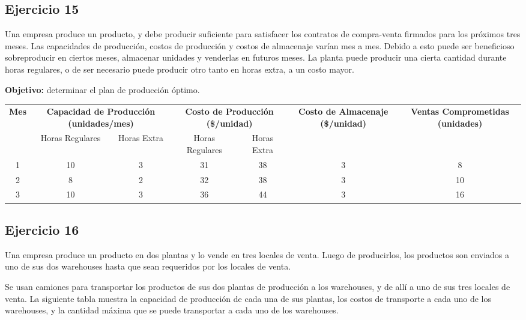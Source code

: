 \documentclass[12pt]{article}
\begin{document}
\subsection{Ejercicio 15}

Una empresa produce un producto, y debe producir suficiente para satisfacer los contratos de compra-venta firmados para los próximos tres meses. Las capacidades de producción, costos de producción y costos de almacenaje varían mes a mes. Debido a esto puede ser beneficioso sobreproducir en ciertos meses, almacenar unidades y venderlas en futuros meses. La planta puede producir una cierta cantidad durante horas regulares, o de ser necesario puede producir otro tanto en horas extra, a un costo mayor.

\textbf{Objetivo:} determinar el plan de producción óptimo.

\begin{center}
\begin{tabular}{c|cc|cc|c|c}
\toprule
\textbf{Mes} & \multicolumn{2}{c|}{\textbf{Capacidad de Producción (unidades/mes)}} & \multicolumn{2}{c|}{\textbf{Costo de Producción (\$/unidad)}} & \textbf{Costo de Almacenaje (\$/unidad)} & \textbf{Ventas Comprometidas (unidades)} \\
\cmidrule(lr){2-3} \cmidrule(lr){4-5}
& Horas Regulares & Horas Extra & Horas Regulares & Horas Extra & & \\
\midrule
1 & 10 & 3 & 31 & 38 & 3 & 8 \\
2 & 8 & 2 & 32 & 38 & 3 & 10 \\
3 & 10 & 3 & 36 & 44 & 3 & 16 \\
\bottomrule
\end{tabular}
\end{center}

\subsection{Ejercicio 16}

Una empresa produce un producto en dos plantas y lo vende en tres locales de venta. Luego de producirlos, los productos son enviados a uno de sus dos warehouses hasta que sean requeridos por los locales de venta.

Se usan camiones para transportar los productos de sus dos plantas de producción a los warehouses, y de allí a uno de sus tres locales de venta. La siguiente tabla muestra la capacidad de producción de cada una de sus plantas, los costos de transporte a cada uno de los warehouses, y la cantidad máxima que se puede transportar a cada uno de los warehouses.
\end{document}
